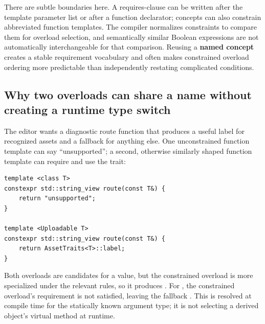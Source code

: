 There are subtle boundaries here. A requires-clause can be written after the template parameter list or after a function declarator; concepts can also constrain abbreviated function templates. The compiler normalizes constraints to compare them for overload selection, and semantically similar Boolean expressions are not automatically interchangeable for that comparison. Reusing a \textbf{named concept} creates a stable requirement vocabulary and often makes constrained overload ordering more predictable than independently restating complicated conditions.

\subsection{Why two overloads can share a name without creating a runtime type switch}\label{01-foundations-i-ch005-why-two-overloads-can-share-a-name-without-creating-a-runtime-type-switch}

\hypertarget{01-foundations-i-ch005-why-two-overloads-can-share-a-name-without-creating-a-runtime-type-switch}{}

The editor wants a diagnostic route function that produces a useful label for recognized assets and a fallback for anything else. One unconstrained function template can say ``unsupported''; a second, otherwise similarly shaped function template can require  and use the trait:

\begin{verbatim}
template <class T>
constexpr std::string_view route(const T&) {
    return "unsupported";
}

template <Uploadable T>
constexpr std::string_view route(const T&) {
    return AssetTraits<T>::label;
}
\end{verbatim}

Both overloads are candidates for a  value, but the constrained overload is more specialized under the relevant rules, so it produces . For , the constrained overload's requirement is not satisfied, leaving the fallback . This is resolved at compile time for the statically known argument type; it is not selecting a derived object's virtual method at runtime.

